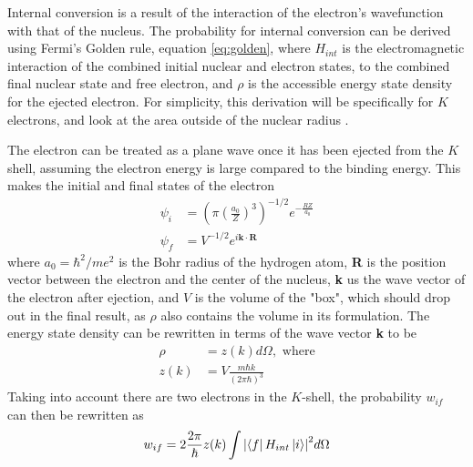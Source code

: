 Internal conversion is a result of the interaction of the electron's wavefunction with that of the nucleus. The probability for internal conversion can be derived using Fermi's Golden rule, equation \ref{eq:golden}, where $H_{int}$ is the electromagnetic interaction of the combined initial nuclear and electron states, to the combined final nuclear state and free electron, and $\rho$ is the accessible energy state density for the ejected electron. For simplicity, this derivation will be specifically for $K$ electrons, and look at the area outside of the nuclear radius \citep{roy67:_e0, blatt79:_emradiation, segre77:_icradiation}.

The electron can be treated as a plane wave once it has been ejected from the $K$ shell, assuming the electron energy is large compared to the binding energy. This makes the initial and final states of the electron
\begin{subequations}
\begin{align}
    \psi_{i} & = \left(\pi\left(\frac{a_0}{Z}\right)^3\right)^{-1/2}e^{-\frac{RZ}{a_0}}\\
    \psi_{f} & = V^{-1/2}e^{i\textbf{k}\cdot\textbf{R}}
\end{align}
\end{subequations}
where $a_0=\hbar^2/me^2$ is the Bohr radius of the hydrogen atom, \textbf{R} is the position vector between the electron and the center of the nucleus, \textbf{k} us the wave vector of the electron after ejection, and $V$ is the volume of the "box", which should drop out in the final result, as $\rho$ also contains the volume in its formulation. The energy state density can be rewritten in terms of the wave vector \textbf{k} to be 
\begin{align}
    \rho & = z(k)d\Omega, \text{ where} \\
    z(k) & = V\frac{m\hbar k}{(2\pi\hbar)^3}
\end{align}
Taking into account there are two electrons in the $K$-shell, the probability $w_{if}$ can then be rewritten as
\begin{equation}
\label{eq:golden_ic}
    w_{if}=2 \frac{2\pi}{\hbar}z(k)\int\abs{\bra{f}H_{int}\ket{i}}^2d\Omega
\end{equation}

